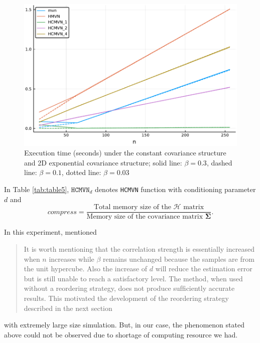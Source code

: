 \begin{figure}
	\centering
	\includegraphics[width=0.7\linewidth]{figs/table5_time.pdf}
	\caption{Execution time (seconds) under the constant covariance structure and 2D exponential covariance structure; solid line: $\beta=0.3$, dashed line: $\beta=0.1$, dotted line: $\beta=0.03$}\label{fig:table5_time}
\end{figure}

In Table \ref{tab:table5}, $\texttt{HCMVN}_d$ denotes \texttt{HCMVN} function with conditioning parameter $d$ and  
$$compress = \frac{\text{Total memory size of the } \mathcal{H} \text{ matrix}}{\text{Memory size of the covariance matrix } \boldsymbol{\Sigma}}.$$ 

In this experiment, \citet{cao2019hierarchical} mentioned 
\begin{quote}
	It is worth mentioning that the correlation strength is essentially increased when $n$ increases while $\beta$ remains unchanged because the samples are from the unit hypercube. Also the increase of $d$ will reduce the estimation error but is still unable to reach a satisfactory level. The method, when used without a reordering strategy, does not produce sufﬁciently accurate results. This motivated the development of the reordering strategy described in the next section
\end{quote}
with extremely large size simulation. But, in our case, the phenomenon stated above could not be observed due to shortage of computing resource we had.

